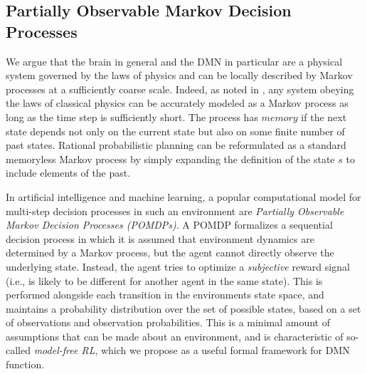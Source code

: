 \documentclass[10pt,letterpaper]{article}
\begin{document}
\subsection{Partially Observable Markov Decision Processes}
We argue that the brain in general and the DMN in particular
are a physical system governed by the laws of
physics and can be locally described by Markov processes at a sufficiently coarse scale.
Indeed, as noted in \cite{tegmark2016improved},
any system obeying the laws of classical physics can be accurately modeled as a Markov process as long as the time
step is sufficiently short.
The process has $memory$ if the next state depends not only on the current state but also on some finite
number of past states.
Rational probabilistic planning can be reformulated
as a standard memoryless Markov process by simply expanding the
definition of the state $s$ to include elements of the past.

In artificial intelligence and machine learning, a popular computational model for
multi-step decision processes in such an environment are
\textit{Partially Observable Markov Decision Processes (POMDPs)}.
A POMDP formalizes a sequential decision process in which it is assumed that environment dynamics are determined by a Markov process,
but the agent cannot directly observe the underlying state.
Instead, the agent tries to optimize a \textit{subjective} reward
signal (i.e., is likely to be different for another agent in the same state).
This is performed alongside each transition in the environments state space, and maintains a probability distribution over the set of possible
states, based on a set of observations and observation probabilities. This is a minimal amount of assumptions that can be made about an environment,
and is characteristic of so-called \textit{model-free RL},
which we propose as a useful formal framework for DMN function.
\end{document}
